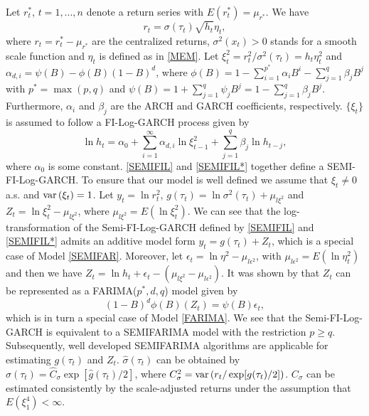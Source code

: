 \documentclass[12pt]{article}
\newcommand{\var}{\mbox{var\,}}
\begin{document}
Let $r^*_t$, $t = 1,...,n$ denote a return series with $E(r^*_t) = \mu_{r^*}$. We have
\begin{equation}
	\label{SEMIFIL}
	r_t=\sigma(\tau_t) \sqrt{h_t} \eta_t,
\end{equation}
where $r_t = r_t^* - \mu_{r^*}$ are the centralized returns, $\sigma^2(x_t) >0$ stands for a smooth scale function and $\eta_t$ is defined as in \eqref{MEM}. Let $\xi_t^2=r_t^2 / \sigma^2(\tau_t)=h_t \eta_t^2$ and  $\alpha_{d,i} = \psi(B) - \phi(B)(1-B)^d$, where $\phi(B) = 1 - \sum_{i = 1}^{p^*}\alpha_i B^i - \sum_{j = 1}^{q}\beta_jB^j$ with $p^* = \max(p,q)$ and $\psi(B) = 1 + \sum_{j=1}^{q}\psi_jB^j = 1 - \sum_{j = 1}^{q}\beta_jB^j$. Furthermore, $\alpha_i$ and $\beta_j$ are the ARCH and GARCH coefficients, respectively. $\{\xi_t\}$ is assumed to follow a FI-Log-GARCH process given by 
\begin{equation}
	\label{SEMIFIL*}
	\ln h_t = \alpha_0 + \sum_{i = 1}^{\infty}\alpha_{d,i} \ln \xi_{t-1}^2 + \sum_{j = 1}^{q} \beta_j \ln h_{t-j},	
\end{equation}
where $\alpha_0$ is some constant. \eqref{SEMIFIL} and \eqref{SEMIFIL*} together define a SEMI-FI-Log-GARCH. To ensure that our model is well defined we assume that $\xi_t \neq 0$ a.s. and $\var(\xi_t) = 1$. Let $y_t = \ln r^2_t$, $g(\tau_t) = \ln \sigma^2(\tau_t) + \mu_{l\xi^2}$ and $Z_t = \ln \xi^2_t - \mu_{l\xi^2}$, where $\mu_{l\xi^2} = E(\ln \xi_t^2)$. 
We can see that the log-transformation of the Semi-FI-Log-GARCH defined by \eqref{SEMIFIL} and \eqref{SEMIFIL*}  admits an additive model form $y_t = g(\tau_t) + Z_t$, which is a special case of Model \eqref{SEMIFAR}. Moreover, let $\epsilon_t = \ln \eta^2 - \mu_{l\epsilon^2}$, with $\mu_{l\epsilon^2} = E(\ln \eta^2_t)$ and then we have $Z_t = \ln h_t + \epsilon_t - (\mu_{l\xi^2} - \mu_{l\epsilon^2})$. It was shown by \citet{feng2020fractionally} that $Z_t$ can be represented as a FARIMA($p^*,d,q$) model given by 
\begin{equation}
	(1-B)^d\phi(B)(Z_t) = \psi(B)\epsilon_t,	
\end{equation}
which is in turn a special case of Model \eqref{FARIMA}. We see that the Semi-FI-Log-GARCH is equivalent to a SEMIFARIMA model with the restriction $p \geq q$. Subsequently, well developed SEMIFARIMA algorithms are applicable for estimating $g(\tau_t)$ and $Z_t$. %
$\hat{\sigma}(\tau_t)$ can be obtained by $\hat{\sigma}(\tau_t) = \hat{C}_\sigma \exp [\hat{g}(\tau_t) / 2]$, where $C_\sigma^2 = \var (r_t / \exp[g(\tau_t) / 2])$. $C_\sigma$ can be estimated consistently by the scale-adjusted returns under the assumption that $E(\xi_1^4)<\infty$.
\end{document}
